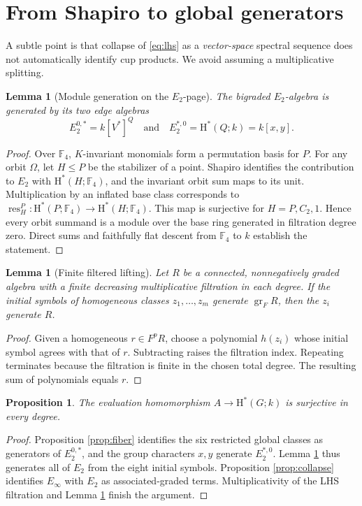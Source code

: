 \documentclass[11pt,a4paper]{article}
\newtheorem{lemma}[theorem]{Lemma}
\newtheorem{proposition}[theorem]{Proposition}
\theoremstyle{remark}\newtheorem{remark}[theorem]{Remark}
\newcommand{\F}{\mathbb F}
\newcommand{\HH}{\mathrm H}
\newcommand{\res}{\operatorname{res}}
\begin{document}
\section{From Shapiro to global generators}\label{sec:generation}
A subtle point is that collapse of \eqref{eq:lhs} as a \emph{vector-space} spectral sequence does not automatically identify cup products. We avoid assuming a multiplicative splitting.

\begin{lemma}[Module generation on the \(E_2\)-page]\label{lem:shapiro}
The bigraded \(E_2\)-algebra is generated by its two edge algebras
\[
E_2^{0,*}=k[V^*]^Q\quad\text{and}\quad E_2^{*,0}=\HH^*(Q;k)=k[x,y].
\]
\end{lemma}
\begin{proof}
Over \(\F_4\), \(K\)-invariant monomials form a permutation basis for \(P\). For any orbit \(\Omega\), let \(H\le P\) be the stabilizer of a point. Shapiro identifies the contribution to \(E_2\) with \(\HH^*(H;\F_4)\), and the invariant orbit sum maps to its unit. Multiplication by an inflated base class corresponds to \(\res_H^P:\HH^*(P;\F_4)\to\HH^*(H;\F_4)\). This map is surjective for \(H=P,C_2,1\). Hence every orbit summand is a module over the base ring generated in filtration degree zero. Direct sums and faithfully flat descent from \(\F_4\) to \(k\) establish the statement.
\end{proof}

\begin{lemma}[Finite filtered lifting]\label{lem:filtered}
Let \(R\) be a connected, nonnegatively graded algebra with a finite decreasing multiplicative filtration in each degree. If the initial symbols of homogeneous classes \(z_1,\dots,z_m\) generate \(\operatorname{gr}_F R\), then the \(z_i\) generate \(R\).
\end{lemma}
\begin{proof}
Given a homogeneous \(r\in F^pR\), choose a polynomial \(h(z_i)\) whose initial symbol agrees with that of \(r\). Subtracting raises the filtration index. Repeating terminates because the filtration is finite in the chosen total degree. The resulting sum of polynomials equals \(r\).
\end{proof}

\begin{proposition}\label{prop:surj}
The evaluation homomorphism \(A\to\HH^*(G;k)\) is surjective in every degree.
\end{proposition}
\begin{proof}
Proposition \ref{prop:fiber} identifies the six restricted global classes as generators of \(E_2^{0,*}\), and the group characters \(x,y\) generate \(E_2^{*,0}\). Lemma \ref{lem:shapiro} thus generates all of \(E_2\) from the eight initial symbols. Proposition \ref{prop:collapse} identifies \(E_\infty\) with \(E_2\) as associated-graded terms. Multiplicativity of the LHS filtration and Lemma \ref{lem:filtered} finish the argument.
\end{proof}
\end{document}
